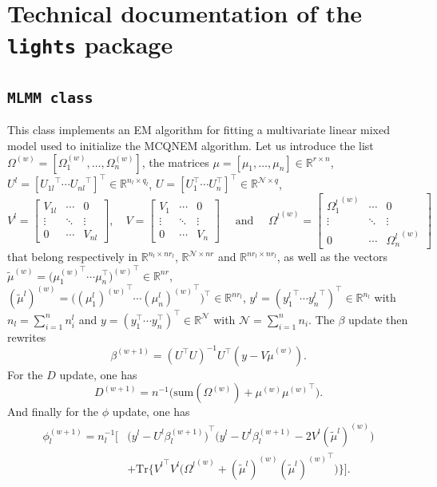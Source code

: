 \documentclass[11pt]{article}
\newcommand{\cN}{\mathcal N}
\newcommand{\R}{\mathds R}
\begin{document}
\section{Technical documentation of the \texttt{lights} package}
\label{sec:package}

\subsection{\texttt{MLMM class}}
\label{sec:MLMM class}

This class implements an EM algorithm for fitting a multivariate linear mixed model used to initialize the MCQNEM algorithm.
Let us introduce the list $\Omega^{(w)} = [\Omega_1^{(w)}, \ldots, \Omega_n^{(w)}]$, the matrices $\mu = [\mu_1, \ldots, \mu_n] \in \R^{r \times n}$, $U^l = [{U_{1l}}^\top \cdots {U_{nl}}^\top]^\top \in \R^{n_l \times q_l}$, $U = [U_1^\top \cdots U_n^\top]^\top \in \R^{\cN \times q}$,
\[ V^l = \begin{bmatrix}
    V_{1l} & \cdots & 0\\
    \vdots &  \ddots & \vdots \\
    0 & \cdots & V_{nl}
\end{bmatrix},
\quad
V = \begin{bmatrix}
  V_{1} & \cdots & 0\\
  \vdots &  \ddots & \vdots \\
  0 & \cdots & V_{n}
\end{bmatrix}
\quad \text{ and } \quad
{\Omega^l}^{(w)} = \begin{bmatrix}
    {\Omega_{1}^l}^{(w)} & \cdots & 0\\
    \vdots &  \ddots & \vdots \\
    0 & \cdots & {\Omega_{n}^l}^{(w)}
\end{bmatrix}\]
that belong respectively in $\R^{n_l \times nr_l}$, $\R^{\cN \times nr}$ and $\R^{nr_l \times nr_l}$, as well as the vectors $\tilde \mu^{(w)} = ({\mu_1^{(w)}}^\top \cdots {\mu_n^\top)^{(w)}}^\top \in \R^{nr}$, $(\tilde \mu^l)^{(w)} = \big({(\mu_1^l)^{(w)}}^\top \cdots {(\mu_n^l)^{(w)}}^\top \big)^\top \in \R^{nr_l}$, $y^l = ({y_1^l}^\top  \cdots {y_n^l}^\top)^\top \in \R^{n_l}$
with $n_l = \sum_{i=1}^{n} n_i^l$ and $y = (y_1^\top \cdots y_n^\top)^\top \in \R^\cN$ with $\cN = \sum_{i=1}^{n} n_i$.
The $\beta$ update then rewrites
\[\beta^{(w+1)} = ({U}^\top U)^{-1}{U}^\top(y-V \tilde \mu^{(w)}).\]
For the $D$ update, one has
\[D^{(w+1)} = n^{-1} \big( \text{sum}(\Omega^{(w)}) + \mu^{(w)}{\mu^{(w)}}^\top\big).\]
And finally for the $\phi$ update, one has
\begin{align*}
\phi_l^{(w+1)} = n_l^{-1} \big[&(y^l - U^l{\beta_l^{(w+1)})}^\top \big(y^l - U^l\beta_l^{(w+1)} - 2 V^l (\tilde\mu^l)^{(w)}\big) \\
&+ \text{Tr}\big\{{V^l}^\top V^l \big({\Omega^l}^{(w)} + (\tilde\mu^l)^{(w)} {(\tilde\mu^l)^{(w)}}^\top\big)\big\} \big].
\end{align*}
\end{document}
